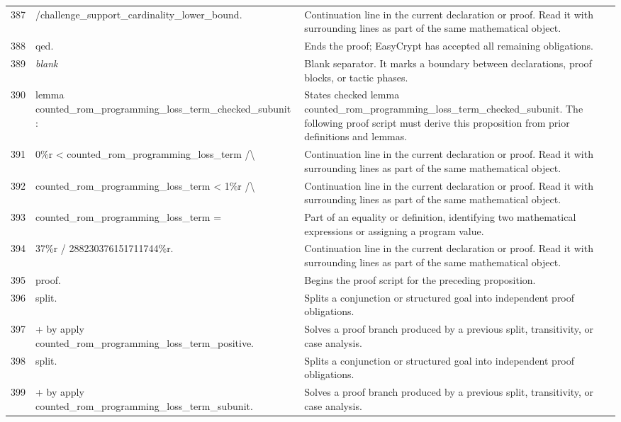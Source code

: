 \documentclass[10pt]{article}
\begin{document}
\begin{longtable}{r L{0.53\textwidth} L{0.37\textwidth}}
387 & {\ttfamily\scriptsize            /challenge\_support\_cardinality\_lower\_bound.} & Continuation line in the current declaration or proof.  Read it with surrounding lines as part of the same mathematical object. \\
388 & {\ttfamily\scriptsize qed.} & Ends the proof; EasyCrypt has accepted all remaining obligations. \\
389 & {\ttfamily\scriptsize \emph{blank}} & Blank separator.  It marks a boundary between declarations, proof blocks, or tactic phases. \\
390 & {\ttfamily\scriptsize lemma counted\_rom\_programming\_loss\_term\_checked\_subunit :} & States checked lemma counted\_rom\_programming\_loss\_term\_checked\_subunit.  The following proof script must derive this proposition from prior definitions and lemmas. \\
391 & {\ttfamily\scriptsize   0\%r < counted\_rom\_programming\_loss\_term /\textbackslash{}} & Continuation line in the current declaration or proof.  Read it with surrounding lines as part of the same mathematical object. \\
392 & {\ttfamily\scriptsize   counted\_rom\_programming\_loss\_term < 1\%r /\textbackslash{}} & Continuation line in the current declaration or proof.  Read it with surrounding lines as part of the same mathematical object. \\
393 & {\ttfamily\scriptsize   counted\_rom\_programming\_loss\_term =} & Part of an equality or definition, identifying two mathematical expressions or assigning a program value. \\
394 & {\ttfamily\scriptsize     37\%r / 288230376151711744\%r.} & Continuation line in the current declaration or proof.  Read it with surrounding lines as part of the same mathematical object. \\
395 & {\ttfamily\scriptsize proof.} & Begins the proof script for the preceding proposition. \\
396 & {\ttfamily\scriptsize split.} & Splits a conjunction or structured goal into independent proof obligations. \\
397 & {\ttfamily\scriptsize + by apply counted\_rom\_programming\_loss\_term\_positive.} & Solves a proof branch produced by a previous split, transitivity, or case analysis. \\
398 & {\ttfamily\scriptsize split.} & Splits a conjunction or structured goal into independent proof obligations. \\
399 & {\ttfamily\scriptsize + by apply counted\_rom\_programming\_loss\_term\_subunit.} & Solves a proof branch produced by a previous split, transitivity, or case analysis. \\

\end{longtable}
\end{document}
